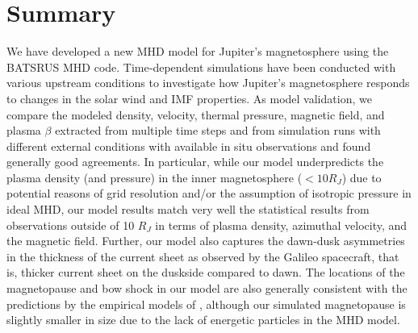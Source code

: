 \section{Summary}
We have developed a new MHD model for Jupiter's magnetosphere using the BATSRUS MHD code. Time‐dependent simulations have been conducted with various upstream conditions to investigate how Jupiter's magnetosphere responds to changes in the solar wind and IMF properties. As model validation, we compare the modeled density, velocity, thermal pressure, magnetic field, and plasma $\beta$ extracted from multiple time steps and from simulation runs with different external conditions with available in situ observations and found generally good agreements. In particular, while our model underpredicts the plasma density (and pressure) in the inner magnetosphere ($<10 R_J$) due to potential reasons of grid resolution and/or the assumption of isotropic pressure in ideal MHD, our model results match very well the statistical results from observations outside of 10 $R_J$ in terms of plasma density, azimuthal velocity, and the magnetic field. Further, our model also captures the dawn‐dusk asymmetries in the thickness of the current sheet \cite{Khurana2005,Vogt2011a} as observed by the Galileo spacecraft, that is, thicker current sheet on the duskside compared to dawn. The locations of the magnetopause and bow shock in our model are also generally consistent with the predictions by the empirical models of \cite{Joy2002a}, although our simulated magnetopause is slightly smaller in size due to the lack of energetic particles in the MHD model. 